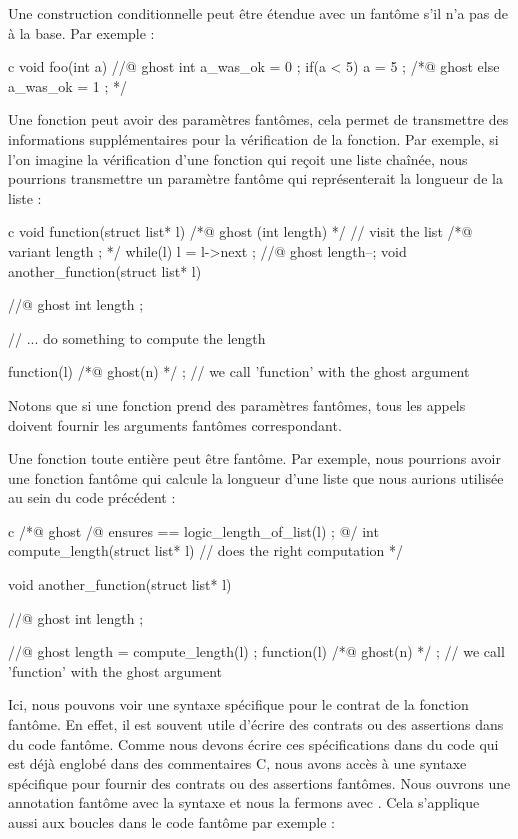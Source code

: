 Une construction conditionnelle  peut être étendue avec un
 fantôme s'il n'a pas de  à la base. Par
exemple :


\begin{CodeBlock}{c}
void foo(int a){
  //@ ghost int a_was_ok = 0 ;
  if(a < 5){
    a = 5 ;
  } /*@ ghost else {
    a_was_ok = 1 ;
  } */
}
\end{CodeBlock}


Une fonction peut avoir des paramètres fantômes, cela permet de transmettre des
informations supplémentaires pour la vérification de la fonction. Par exemple,
si l'on imagine la vérification d'une fonction qui reçoit une liste chaînée,
nous pourrions transmettre un paramètre fantôme qui représenterait la
longueur de la liste :


\begin{CodeBlock}{c}
void function(struct list* l) /*@ ghost (int length) */ {
  // visit the list
  /*@ variant length ; */
  while(l){
    l = l->next ;
    //@ ghost length--;
  }
}
void another_function(struct list* l){
  //@ ghost int length ;

  // ... do something to compute the length

  function(l) /*@ ghost(n) */ ; // we call 'function' with the ghost argument
}
\end{CodeBlock}


Notons que si une fonction prend des paramètres fantômes, tous les appels doivent
fournir les arguments fantômes correspondant.


Une fonction toute entière peut être fantôme. Par exemple, nous pourrions avoir
une fonction fantôme qui calcule la longueur d'une liste que nous aurions utilisée
au sein du code précédent :

\begin{CodeBlock}{c}
/*@ ghost
  /@ ensures \result == logic_length_of_list(l) ; @/
  int compute_length(struct list* l){
    // does the right computation
  }
*/

void another_function(struct list* l){
  //@ ghost int length ;

  //@ ghost length = compute_length(l) ;
  function(l) /*@ ghost(n) */ ; // we call 'function' with the ghost argument
}
\end{CodeBlock}


Ici, nous pouvons voir une syntaxe spécifique pour le contrat de la fonction
fantôme. En effet, il est souvent utile d'écrire des contrats ou des assertions
dans du code fantôme. Comme nous devons écrire ces spécifications dans du code
qui est déjà englobé dans des commentaires C, nous avons accès à une syntaxe
spécifique pour fournir des contrats ou des assertions fantômes. Nous ouvrons
une annotation fantôme avec la syntaxe  et nous la fermons avec
. Cela s'applique aussi aux boucles dans le code fantôme par
exemple :


